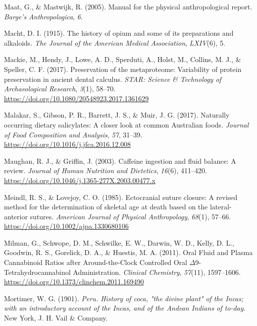 \documentclass[
  b5paper,
]{book}
\newlength{\cslhangindent}
\newenvironment{CSLReferences}[2] %
 {\begin{list}{}{%
  \setlength{\itemindent}{0pt}
  \setlength{\leftmargin}{0pt}
  \setlength{\parsep}{0pt}
  \ifodd #1
   \setlength{\leftmargin}{\cslhangindent}
   \setlength{\itemindent}{-1\cslhangindent}
  \fi
  \setlength{\itemsep}{#2\baselineskip}}}
 {\end{list}}
\begin{document}
\begin{CSLReferences}{1}{0}
Maat, G., \& Mastwijk, R. (2005). Manual for the physical
anthropological report. \emph{Barge's Anthropologica}, \emph{6}.

Macht, D. I. (1915). The history of opium and some of its preparations
and alkaloids. \emph{The Journal of the American Medical Association},
\emph{LXIV}(6), 5.

Mackie, M., Hendy, J., Lowe, A. D., Sperduti, A., Holst, M., Collins, M.
J., \& Speller, C. F. (2017). Preservation of the metaproteome:
Variability of protein preservation in ancient dental calculus.
\emph{STAR: Science \& Technology of Archaeological Research},
\emph{3}(1), 58--70. \url{https://doi.org/10.1080/20548923.2017.1361629}

Malakar, S., Gibson, P. R., Barrett, J. S., \& Muir, J. G. (2017).
Naturally occurring dietary salicylates: {A} closer look at common
{Australian} foods. \emph{Journal of Food Composition and Analysis},
\emph{57}, 31--39. \url{https://doi.org/10.1016/j.jfca.2016.12.008}

Maughan, R. J., \& Griffin, J. (2003). Caffeine ingestion and fluid
balance: A review. \emph{Journal of Human Nutrition and Dietetics},
\emph{16}(6), 411--420.
\url{https://doi.org/10.1046/j.1365-277X.2003.00477.x}

Meindl, R. S., \& Lovejoy, C. O. (1985). Ectocranial suture closure: {A}
revised method for the determination of skeletal age at death based on
the lateral-anterior sutures. \emph{American Journal of Physical
Anthropology}, \emph{68}(1), 57--66.
\url{https://doi.org/10.1002/ajpa.1330680106}

Milman, G., Schwope, D. M., Schwilke, E. W., Darwin, W. D., Kelly, D.
L., Goodwin, R. S., Gorelick, D. A., \& Huestis, M. A. (2011). Oral
{Fluid} and {Plasma Cannabinoid Ratios} after {Around-the-Clock
Controlled Oral \(\Delta\)9-Tetrahydrocannabinol Administration}.
\emph{Clinical Chemistry}, \emph{57}(11), 1597--1606.
\url{https://doi.org/10.1373/clinchem.2011.169490}

Mortimer, W. G. (1901). \emph{Peru. {History} of coca, "the divine
plant" of the {Incas}; with an introductory account of the {Incas}, and
of the {Andean Indians} of to-day}. {New York, J. H. Vail \& Company}.


\end{CSLReferences}
\end{document}

